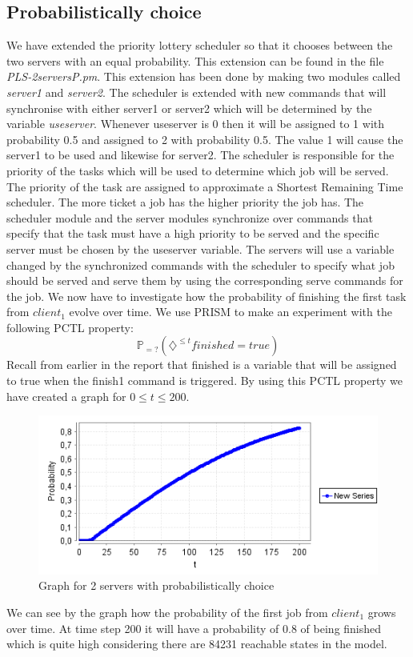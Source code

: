 \documentclass[12pt]{report}
\begin{document}
\subsection*{Probabilistically choice}
We have extended the priority lottery scheduler so that it chooses between the two servers with an equal probability. This extension can be found in the file \emph{PLS-2serversP.pm}. This extension has been done by making two modules called \emph{server1} and \emph{server2}. The scheduler is extended with new commands that will synchronise with either server1 or server2 which will be determined by the variable \emph{useserver}. Whenever useserver is 0 then it will be assigned to 1 with probability 0.5 and assigned to 2 with probability 0.5. The value 1 will cause the server1 to be used and likewise for server2. The scheduler is responsible for the priority of the tasks which will be used to determine which job will be served. The priority of the task are assigned to approximate a Shortest Remaining Time scheduler. The more ticket a job has the higher priority the job has. The scheduler module and the server modules synchronize over commands that specify that the task must have a high priority to be served and the specific server must be chosen by the useserver variable. The servers will use a variable changed by the synchronized commands with the scheduler to specify what job should be served and serve them by using the corresponding serve commands for the job. We now have to investigate how the probability of finishing the first task from $client_1$ evolve over time. We use PRISM to make an experiment with the following PCTL property:
$$\mathbb{P}_{=?}(\diamondsuit^{\leq t} finished=true)$$
Recall from earlier in the report that finished is a variable that will be assigned to true when the finish1 command is triggered. By using this PCTL property we have created a graph for $0 \leq t \leq 200$.
\begin{figure}[H]
	\begin{center}
		\includegraphics[scale=0.75]{../GFX/C1.png}
	\end{center}
	\caption{Graph for 2 servers with probabilistically choice}
\end{figure}
We can see by the graph how the probability of the first job from $client_1$ grows over time. At time step 200 it will have a probability of 0.8 of being finished which is quite high considering there are 84231 reachable states in the model.
\end{document}
